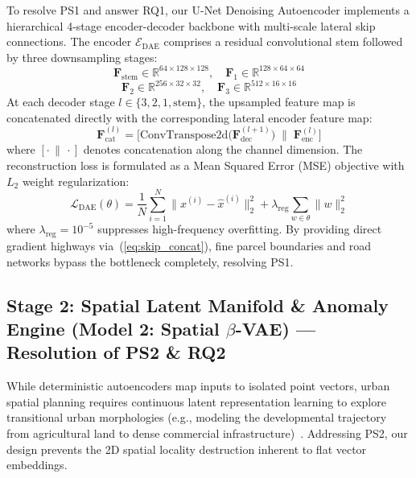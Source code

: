 \documentclass[journal]{IEEEtran}
\begin{document}
To resolve PS1 and answer RQ1, our U-Net Denoising Autoencoder implements a hierarchical 4-stage encoder-decoder backbone with multi-scale lateral skip connections. The encoder $\mathcal{E}_{\text{DAE}}$ comprises a residual convolutional stem followed by three downsampling stages:
\begin{equation}
\mathbf{F}_{\text{stem}} \in \mathbb{R}^{64 \times 128 \times 128}, \quad \mathbf{F}_1 \in \mathbb{R}^{128 \times 64 \times 64}
\end{equation}
\begin{equation}
\mathbf{F}_2 \in \mathbb{R}^{256 \times 32 \times 32}, \quad \mathbf{F}_3 \in \mathbb{R}^{512 \times 16 \times 16}
\end{equation}
At each decoder stage $l \in \{3, 2, 1, \text{stem}\}$, the upsampled feature map is concatenated directly with the corresponding lateral encoder feature map:
\begin{equation}
\mathbf{F}_{\text{cat}}^{(l)} = \Big[\text{ConvTranspose2d}\big(\mathbf{F}_{\text{dec}}^{(l+1)}\big) \;\Big\|\; \mathbf{F}_{\text{enc}}^{(l)}\Big]
\label{eq:skip_concat}
\end{equation}
where $[\cdot \,\|\, \cdot]$ denotes concatenation along the channel dimension. The reconstruction loss is formulated as a Mean Squared Error (MSE) objective with $L_2$ weight regularization:
\begin{equation}
\mathcal{L}_{\text{DAE}}(\theta) = \frac{1}{N} \sum_{i=1}^N \|x^{(i)} - \hat{x}^{(i)}\|_2^2 + \lambda_{\text{reg}} \sum_{w \in \theta} \|w\|_2^2
\label{eq:dae_loss}
\end{equation}
where $\lambda_{\text{reg}} = 10^{-5}$ suppresses high-frequency overfitting. By providing direct gradient highways via~(\ref{eq:skip_concat}), fine parcel boundaries and road networks bypass the bottleneck completely, resolving PS1.

\subsection{Stage 2: Spatial Latent Manifold \& Anomaly Engine (Model 2: Spatial $\beta$-VAE) --- Resolution of PS2 \& RQ2}
While deterministic autoencoders map inputs to isolated point vectors, urban spatial planning requires continuous latent representation learning to explore transitional urban morphologies (e.g., modeling the developmental trajectory from agricultural land to dense commercial infrastructure)~\cite{kingma2013auto,higgins2017beta}. Addressing PS2, our design prevents the 2D spatial locality destruction inherent to flat vector embeddings.
\end{document}
